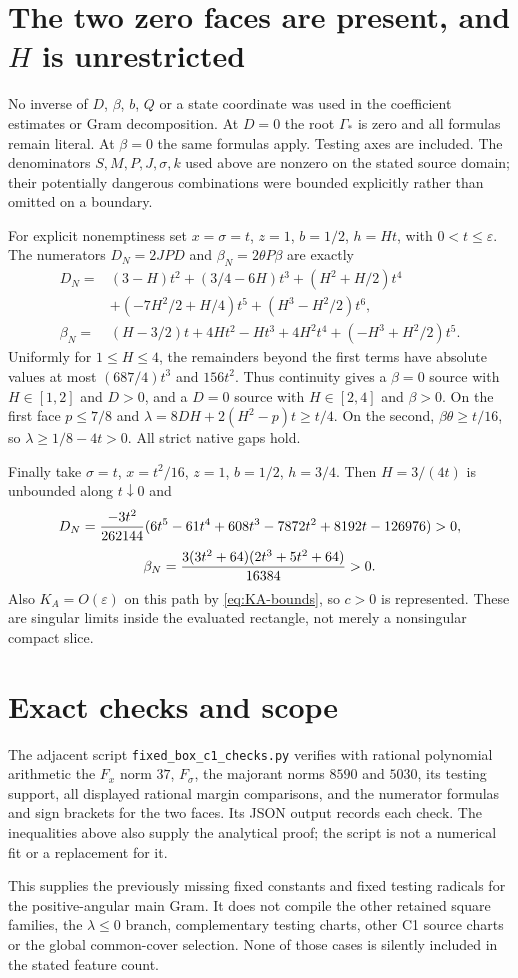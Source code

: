 \documentclass[11pt]{article}
\newcommand{\eps}{\varepsilon}
\begin{document}
\section{The two zero faces are present, and $H$ is unrestricted}

No inverse of $D$, $\beta$, $b$, $Q$ or a state coordinate was used
in the coefficient estimates or Gram decomposition. At $D=0$
the root $\Gamma_*$ is zero and all formulas remain literal.
At $\beta=0$ the same formulas apply. Testing axes are included.
The denominators $S,M,P,J,\sigma,k$ used above are nonzero on
the stated source domain; their potentially dangerous combinations
were bounded explicitly rather than omitted on a boundary.

For explicit nonemptiness set $x=\sigma=t$, $z=1$, $b=1/2$,
$h=Ht$, with $0<t\le\eps$. The numerators $D_N=2JPD$ and
$\beta_N=2\theta P\beta$ are exactly
\[
\begin{split}
 D_N={}&(3-H)t^2+(3/4-6H)t^3+(H^2+H/2)t^4\\
       &+(-7H^2/2+H/4)t^5+(H^3-H^2/2)t^6,\\
 \beta_N={}&(H-3/2)t+4Ht^2-Ht^3+4H^2t^4
                                      +(-H^3+H^2/2)t^5.
\end{split}
\]
Uniformly for $1\le H\le4$, the remainders beyond the first
terms have absolute values at most $(687/4)t^3$ and $156t^2$.
Thus continuity gives a $\beta=0$ source with $H\in[1,2]$ and
$D>0$, and a $D=0$ source with $H\in[2,4]$ and $\beta>0$.
On the first face $p\le7/8$ and
$\lambda=8DH+2(H^2-p)t\ge t/4$.
On the second, $\beta\theta\ge t/16$, so
$\lambda\ge1/8-4t>0$. All strict native gaps hold.

Finally take $\sigma=t$, $x=t^2/16$, $z=1$, $b=1/2$, $h=3/4$.
Then $H=3/(4t)$ is unbounded along $t\downarrow0$ and
\[
 D_N={-3t^2\over262144}
 (6t^5-61t^4+608t^3-7872t^2+8192t-126976)>0,
\]
\[
 \beta_N={3(3t^2+64)(2t^3+5t^2+64)\over16384}>0.
\]
Also $K_A=O(\eps)$ on this path by \eqref{eq:KA-bounds}, so
$c>0$ is represented. These are singular limits inside the
evaluated rectangle, not merely a nonsingular compact slice.

\section{Exact checks and scope}

The adjacent script \texttt{fixed\_box\_c1\_checks.py} verifies with
rational polynomial arithmetic the $F_x$ norm $37$, $F_\sigma$,
the majorant norms $8590$ and $5030$, its testing support, all
displayed rational margin comparisons, and the numerator formulas
and sign brackets for the two faces. Its JSON output records each
check. The inequalities above also supply the analytical proof;
the script is not a numerical fit or a replacement for it.

This supplies the previously missing fixed constants and fixed
testing radicals for the positive-angular main Gram. It does not
compile the other retained square families, the $\lambda\le0$
branch, complementary testing charts, other C1 source charts or
the global common-cover selection. None of those cases is silently
included in the stated feature count.
\end{document}
